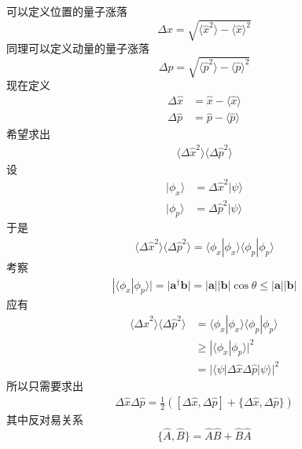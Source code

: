 \documentclass[12pt]{article}
\begin{document}
    可以定义位置的量子涨落
    \begin{equation*}
        \Delta x = \sqrt{\langle \hat{x}^2 \rangle - \langle \hat{x} \rangle^2}
    \end{equation*}
    同理可以定义动量的量子涨落
    \begin{equation*}
        \Delta p = \sqrt{\langle \hat{p}^2 \rangle - \langle \hat{p} \rangle^2}
    \end{equation*}
    现在定义 
    \begin{align*}
        \Delta \hat{x} &= \hat{x} - \langle \hat{x} \rangle \\
        \Delta \hat{p} &= \hat{p} - \langle \hat{p} \rangle
    \end{align*}
    希望求出
    \begin{align*}
        \langle \Delta \hat{x}^2\rangle\langle \Delta \hat{p}^2\rangle
    \end{align*}
    设
    \begin{align*}
        |\phi_x \rangle &= \Delta \hat{x}^2|\psi\rangle\\
        |\phi_p \rangle &= \Delta \hat{p}^2|\psi\rangle
    \end{align*}
    于是 
    \begin{align*}
        \langle \Delta \hat{x}^2\rangle\langle \Delta \hat{p}^2\rangle = \langle \phi_x | \phi_x \rangle \langle \phi_p | \phi_p \rangle
    \end{align*}
    考察
    \begin{align*}
        |\langle \phi_x | \phi_p \rangle| = |\bm{a}^\dagger \bm{b}| = |\bm{a}||\bm{b}|\cos{\theta} \leqslant |\bm{a}||\bm{b}|
    \end{align*}
    应有
    \begin{align*}
        \langle \Delta \hat{x}^2\rangle\langle \Delta \hat{p}^2\rangle &= \langle \phi_x | \phi_x \rangle \langle \phi_p | \phi_p \rangle\\ &\geqslant |\langle \phi_x|\phi_p \rangle|^2\\
        &= |\langle \psi |\Delta \hat{x} \Delta \hat{p}|\psi \rangle|^2
    \end{align*}
    所以只需要求出
    \begin{align*}
        \Delta \hat{x} \Delta \hat{p} = \frac 12([\Delta \hat{x}, \Delta \hat{p}] + \{\Delta \hat{x}, \Delta \hat{p}\})
    \end{align*}
    其中反对易关系
    \begin{equation*}
        \{\hat{A}, \hat{B}\} = \hat{A}\hat{B} + \hat{B}\hat{A}
    \end{equation*}
\end{document}
